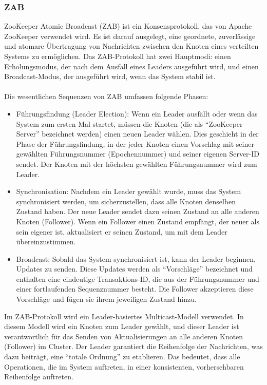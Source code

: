 \subsubsection{ZAB}
ZooKeeper Atomic Broadcast (ZAB) ist ein Konsensprotokoll, das von Apache ZooKeeper verwendet wird. Es ist darauf ausgelegt, eine geordnete, zuverlässige und atomare Übertragung von Nachrichten zwischen den Knoten eines verteilten Systems zu ermöglichen. Das ZAB-Protokoll hat zwei Hauptmodi: einen Erholungsmodus, der nach dem Ausfall eines Leaders ausgeführt wird, und einen Broadcast-Modus, der ausgeführt wird, wenn das System stabil ist.
\\\\
Die wesentlichen Sequenzen von ZAB umfassen folgende Phasen:
\begin{itemize}
\item Führungsfindung (Leader Election): Wenn ein Leader ausfällt oder wenn das System zum ersten Mal startet, müssen die Knoten (die als \enquote{ZooKeeper Server} bezeichnet werden) einen neuen Leader wählen. Dies geschieht in der Phase der Führungsfindung, in der jeder Knoten einen Vorschlag mit seiner gewählten Führungsnummer (Epochennummer) und seiner eigenen Server-ID sendet. Der Knoten mit der höchsten gewählten Führungsnummer wird zum Leader.
\item Synchronisation: Nachdem ein Leader gewählt wurde, muss das System synchronisiert werden, um sicherzustellen, dass alle Knoten denselben Zustand haben. Der neue Leader sendet dazu seinen Zustand an alle anderen Knoten (Follower). Wenn ein Follower einen Zustand empfängt, der neuer als sein eigener ist, aktualisiert er seinen Zustand, um mit dem Leader übereinzustimmen.
\item Broadcast: Sobald das System synchronisiert ist, kann der Leader beginnen, Updates zu senden. Diese Updates werden als \enquote{Vorschläge} bezeichnet und enthalten eine eindeutige Transaktions-ID, die aus der Führungsnummer und einer fortlaufenden Sequenznummer besteht. Die Follower akzeptieren diese Vorschläge und fügen sie ihrem jeweiligen Zustand hinzu.
\end{itemize}
Im ZAB-Protokoll wird ein Leader-basiertes Multicast-Modell verwendet. In diesem Modell wird ein Knoten zum Leader gewählt, und dieser Leader ist verantwortlich für das Senden von Aktualisierungen an alle anderen Knoten (Follower) im Cluster. Der Leader garantiert die Reihenfolge der Nachrichten, was dazu beiträgt, eine \enquote{totale Ordnung} zu etablieren. Das bedeutet, dass alle Operationen, die im System auftreten, in einer konsistenten, vorhersehbaren Reihenfolge auftreten.

